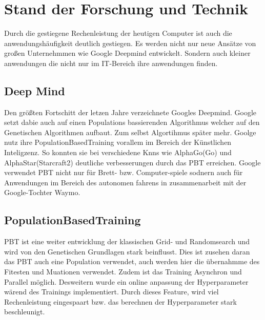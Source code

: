 \section{Stand der Forschung und Technik}
Durch die gestiegene Rechenleistung der heutigen Computer ist auch die anwendungshäufigkeit deutlich gestiegen. 
Es werden nicht nur neue Ansätze von großen Unternehmmen wie Google Deepmind entwickelt. Sondern auch kleiner anwendungen die nicht nur im IT-Bereich ihre anwendungen finden.

\subsection{Deep Mind}
Den größten Fortschitt der letzen Jahre verzeichnete Googles Deepmind. Google setzt dabie auch auf einen Populations bassierenden Algorithmus welcher auf den Genetischen Algorithmen aufbaut. Zum selbst Algortihmus später mehr. Goolge nutz ihre PopulationBasedTraining vorallem im Bereich der Künstlichen Inteligzenz. So konnten sie bei verschiedene Knns wie AlphaGo(Go)\cite{alphago} und AlphaStar(Starcraft2)\cite{alphastar} deutliche verbesserungen durch das PBT erreichen. Google verwendet PBT nicht nur für Brett- bzw. Computer-spiele sodnern auch für Anwendungen im Bereich des autonomen fahrens in zusammenarbeit mit der Google-Tochter Waymo. 

\subsection{PopulationBasedTraining}
PBT ist eine weiter entwicklung der klassischen Grid- und Randomsearch und wird von den Genetischen Grundlagen stark beinflusst. Dies ist zusehen daran das PBT auch eine Population verwendet, auch werden hier die übernahmme des Fitesten und Muationen verwendet. Zudem ist das Training Asynchron und Parallel möglich.
Desweitern wurde ein online anpassung der Hyperparameter wärend des Trainings implementiert. Durch dieses Feature, wird viel Rechenleistung eingespaart bzw. das berechnen der Hyperparameter stark beschleunigt. \cite{pbt}

